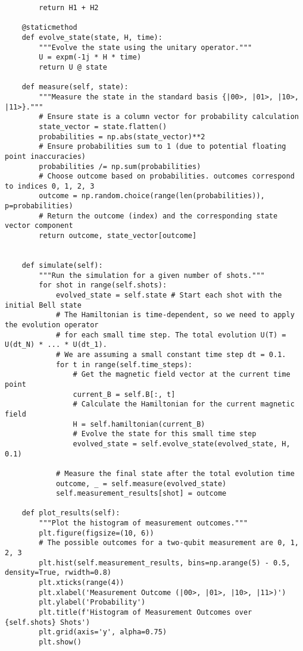 \documentclass{beamer}
\begin{document}
\begin{frame}
\begin{verbatim}
        return H1 + H2

    @staticmethod
    def evolve_state(state, H, time):
        """Evolve the state using the unitary operator."""
        U = expm(-1j * H * time)
        return U @ state

    def measure(self, state):
        """Measure the state in the standard basis {|00>, |01>, |10>, |11>}."""
        # Ensure state is a column vector for probability calculation
        state_vector = state.flatten()
        probabilities = np.abs(state_vector)**2
        # Ensure probabilities sum to 1 (due to potential floating point inaccuracies)
        probabilities /= np.sum(probabilities)
        # Choose outcome based on probabilities. outcomes correspond to indices 0, 1, 2, 3
        outcome = np.random.choice(range(len(probabilities)), p=probabilities)
        # Return the outcome (index) and the corresponding state vector component
        return outcome, state_vector[outcome]


    def simulate(self):
        """Run the simulation for a given number of shots."""
        for shot in range(self.shots):
            evolved_state = self.state # Start each shot with the initial Bell state
            # The Hamiltonian is time-dependent, so we need to apply the evolution operator
            # for each small time step. The total evolution U(T) = U(dt_N) * ... * U(dt_1).
            # We are assuming a small constant time step dt = 0.1.
            for t in range(self.time_steps):
                # Get the magnetic field vector at the current time point
                current_B = self.B[:, t]
                # Calculate the Hamiltonian for the current magnetic field
                H = self.hamiltonian(current_B)
                # Evolve the state for this small time step
                evolved_state = self.evolve_state(evolved_state, H, 0.1)

            # Measure the final state after the total evolution time
            outcome, _ = self.measure(evolved_state)
            self.measurement_results[shot] = outcome

    def plot_results(self):
        """Plot the histogram of measurement outcomes."""
        plt.figure(figsize=(10, 6))
        # The possible outcomes for a two-qubit measurement are 0, 1, 2, 3
        plt.hist(self.measurement_results, bins=np.arange(5) - 0.5, density=True, rwidth=0.8)
        plt.xticks(range(4))
        plt.xlabel('Measurement Outcome (|00>, |01>, |10>, |11>)')
        plt.ylabel('Probability')
        plt.title(f'Histogram of Measurement Outcomes over {self.shots} Shots')
        plt.grid(axis='y', alpha=0.75)
        plt.show()


\end{verbatim}
\end{frame}
\end{document}
